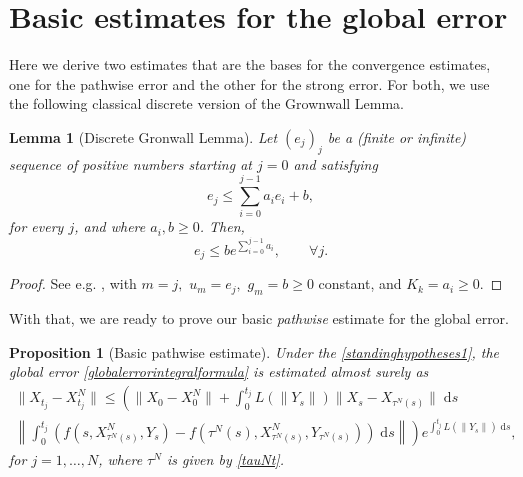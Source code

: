 \documentclass[reqno,12pt]{amsart}
\theoremstyle{plain} %
\newtheorem{lemma}{Lemma}[section]
\newtheorem{proposition}{Proposition}[section]
\theoremstyle{definition} %
\begin{document}
\section{Basic estimates for the global error}

Here we derive two estimates that are the bases for the convergence estimates, one for the pathwise error and the other for the strong error. For both, we use the following classical discrete version of the Grownwall Lemma.

\begin{lemma}[Discrete Gronwall Lemma]
    \label{lemdiscretegronwall}
    Let $(e_j)_j$ be a (finite or infinite) sequence of positive numbers starting at $j=0$ and satisfying
    \begin{equation}
        \label{integralgronwall}
        e_j \leq \sum_{i=0}^{j-1} a_i e_i + b,
    \end{equation}
    for every $j$, and where $a_i, b \geq 0$. Then,
    \begin{equation}
        \label{estimateintegralgronwall}
        e_j \leq b e^{\sum_{i=0}^{j-1} a_i}, \qquad \forall j.
    \end{equation}
\end{lemma}

\begin{proof}
    See e.g. \cite[Lemma 1]{Sugiyama1969}, with $m=j,$ $u_m = e_j,$ $g_m = b \geq 0$ constant, and $K_k = a_i \geq 0.$
\end{proof}

With that, we are ready to prove our basic \emph{pathwise} estimate for the global error.
\begin{proposition}[Basic pathwise estimate]
    \label{propbasicpathwiseestimate}
    Under the \cref{standinghypotheses1}, the global error \eqref{globalerrorintegralformula} is estimated almost surely as
    \begin{multline}
        \label{Etjbasicbound}
            \|X_{t_j} - X_{t_j}^N\| \leq \left( \|X_0 - X_0^N\| + \int_0^{t_j} L(\|Y_s\|)\|X_s - X_{\tau^N(s)}\| \;\mathrm{d}s \right. \\
            \left. \left\|\int_0^{t_j} \left( f(s, X_{\tau^N(s)}^N, Y_s) - f(\tau^N(s), X_{\tau^N(s)}^N, Y_{\tau^N(s)}) \right)\;\mathrm{d}s\right\|\right) e^{\int_0^{t_j} L(\|Y_s\|)\;\mathrm{d}s},
    \end{multline}
    for $j=1, \ldots, N$, where $\tau^N$ is given by \eqref{tauNt}.
\end{proposition}
\end{document}

